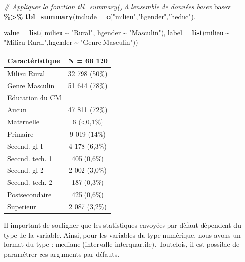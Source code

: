 \documentclass[
]{article}
\newenvironment{Shaded}{\begin{snugshade}}{\end{snugshade}}
\newcommand{\AttributeTok}[1]{\textcolor[rgb]{0.13,0.29,0.53}{#1}}
\newcommand{\CommentTok}[1]{\textcolor[rgb]{0.56,0.35,0.01}{\textit{#1}}}
\newcommand{\FunctionTok}[1]{\textcolor[rgb]{0.13,0.29,0.53}{\textbf{#1}}}
\newcommand{\NormalTok}[1]{#1}
\newcommand{\SpecialCharTok}[1]{\textcolor[rgb]{0.81,0.36,0.00}{\textbf{#1}}}
\newcommand{\StringTok}[1]{\textcolor[rgb]{0.31,0.60,0.02}{#1}}
\begin{document}
\begin{Shaded}
\begin{Highlighting}[]
\CommentTok{\# Appliquer la fonction tbl\_summary() à l\textquotesingle{}ensemble de données \textquotesingle{}basev\textquotesingle{}}
\NormalTok{basev }\SpecialCharTok{\%\textgreater{}\%}
  \FunctionTok{tbl\_summary}\NormalTok{(}\AttributeTok{include =} \FunctionTok{c}\NormalTok{(}\StringTok{"milieu"}\NormalTok{,}\StringTok{"hgender"}\NormalTok{,}\StringTok{"heduc"}\NormalTok{),}
              
  \AttributeTok{value =} \FunctionTok{list}\NormalTok{( milieu }\SpecialCharTok{\textasciitilde{}} \StringTok{"Rural"}\NormalTok{, hgender }\SpecialCharTok{\textasciitilde{}} \StringTok{"Masculin"}\NormalTok{),}
  \AttributeTok{label =} \FunctionTok{list}\NormalTok{(milieu }\SpecialCharTok{\textasciitilde{}} \StringTok{"Milieu Rural"}\NormalTok{,hgender }\SpecialCharTok{\textasciitilde{}} \StringTok{"Genre Masculin"}\NormalTok{))}
\end{Highlighting}
\end{Shaded}

\begin{longtable}[]{@{}lc@{}}
\toprule\noalign{}
\textbf{Caractéristique} & \textbf{N = 66 120} \\
\midrule\noalign{}
\endhead
\bottomrule\noalign{}
\endlastfoot
Milieu Rural & 32 798 (50\%) \\
Genre Masculin & 51 644 (78\%) \\
Education du CM & \\
Aucun & 47 811 (72\%) \\
Maternelle & 6 (\textless0,1\%) \\
Primaire & 9 019 (14\%) \\
Second. gl 1 & 4 178 (6,3\%) \\
Second. tech. 1 & 405 (0,6\%) \\
Second. gl 2 & 2 002 (3,0\%) \\
Second. tech. 2 & 187 (0,3\%) \\
Postsecondaire & 425 (0,6\%) \\
Superieur & 2 087 (3,2\%) \\
\end{longtable}

Il important de souligner que les statistiques envoyées par défaut
dépendent du type de la variable. Ainsi, pour les variables du type
numérique, nous avons un format du type : mediane (intervalle
interquartile). Toutefois, il est possible de paramétrer ces arguments
par défauts.
\end{document}
